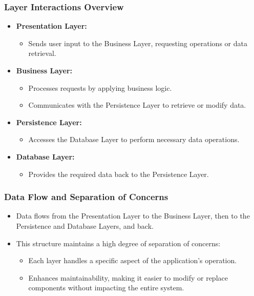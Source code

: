 \documentclass[aspectratio=169, table]{beamer}
\begin{document}
\begin{frame}
	\frametitle{Layer Interactions Overview}
	\begin{itemize}
		\item \textbf{Presentation Layer:}
		\begin{itemize}
			\item Sends user input to the Business Layer, requesting operations or data retrieval.
		\end{itemize}
		\item \textbf{Business Layer:}
		\begin{itemize}
			\item Processes requests by applying business logic.
			\item Communicates with the Persistence Layer to retrieve or modify data.
		\end{itemize}
		\item \textbf{Persistence Layer:}
		\begin{itemize}
			\item Accesses the Database Layer to perform necessary data operations.
		\end{itemize}
		\item \textbf{Database Layer:}
		\begin{itemize}
			\item Provides the required data back to the Persistence Layer.
		\end{itemize}
	\end{itemize}
\end{frame}

\begin{frame}
	\frametitle{Data Flow and Separation of Concerns}
	\begin{itemize}
		\item Data flows from the Presentation Layer to the Business Layer, then to the Persistence and Database Layers, and back.
		\item This structure maintains a high degree of separation of concerns:
		\begin{itemize}
			\item Each layer handles a specific aspect of the application’s operation.
			\item Enhances maintainability, making it easier to modify or replace components without impacting the entire system.
		\end{itemize}
	\end{itemize}
\end{frame}
\end{document}
